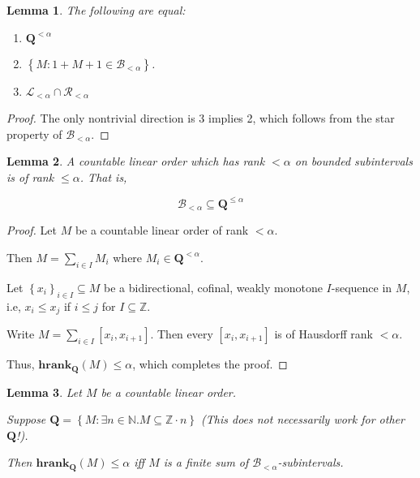 \documentclass{article}
\newtheorem{lemma}{Lemma}
\newcommand{\braces}[1]{\left\{ {#1} \right\}}
\newcommand{\setcomp}[1]{\braces{#1}}
\newcommand{\hrank}[1]{\mathbf{hrank}_{\qq}\left( #1 \right)}
\newcommand{\qq}{\mathbf{Q}}
\newcommand{\NN}{\mathbb{N}}
\newcommand{\ZZ}{\mathbb{Z}}
\begin{document}
\begin{lemma}
  The following are equal:

  \begin{enumerate}
    \item $\qq^{< \alpha}$
    \item $\setcomp{M : 1 + M + 1 \in \mathcal{B}_{< \alpha}}$.
    \item $\mathcal{L}_{< \alpha} \cap \mathcal{R}_{< \alpha}$
  \end{enumerate}

\end{lemma}

\begin{proof}
  The only nontrivial direction is 3 implies 2, which follows from the star property
  of $\mathcal{B}_{< \alpha}$.
\end{proof}

\begin{lemma}
  A countable linear order which has rank $< \alpha$ 
  on bounded subintervals is of rank $\le \alpha$.
  That is,

  $$\mathcal{B}_{< \alpha} \subseteq \qq^{\le \alpha}$$
\end{lemma}

\begin{proof}
  Let $M$ be a countable linear order of rank $< \alpha$.

  Then $M = \sum_{i \in I} M_i$ where $M_i \in \qq^{< \alpha}$.

  Let $\setcomp{x_i}_{i \in I} \subseteq M$ be a bidirectional, cofinal, weakly monotone $I$-sequence in $M$, i.e,
  $x_i \le x_j$ if $i \le j$ for $I \subseteq \ZZ$.

  Write $M = \sum_{i \in I} [x_i, x_{i+1}]$. Then every $[x_i, x_{i+1}]$ is of Hausdorff rank $< \alpha$.

  Thus, $\hrank{M} \le \alpha$, which completes the proof.
\end{proof}

\begin{lemma}
  Let $M$ be a countable linear order.

  Suppose $\qq = \setcomp{M : \exists n \in \NN . M \subseteq \ZZ \cdot n}$
  (This does not necessarily work for other $\qq$!).

  Then $\hrank{M} \le \alpha$ iff $M$ is a finite sum of $\mathcal{B}_{< \alpha}$-subintervals.
\end{lemma}
\end{document}
